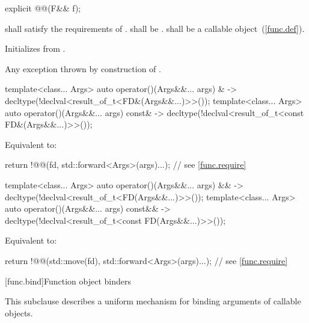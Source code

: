 \begin{itemdecl}
explicit @@(F&& f);
\end{itemdecl}

\begin{itemdescr}
\pnum
\requires
{} shall satisfy the requirements of .
 shall be .
 shall be a callable object~(\ref{func.def}).

\pnum
\effects
Initializes  from .

\pnum
\throws
Any exception thrown by construction of .
\end{itemdescr}

\begin{itemdecl}
template<class... Args>
  auto operator()(Args&&... args) &
    -> decltype(!declval<result_of_t<FD&(Args&&...)>>());
template<class... Args>
  auto operator()(Args&&... args) const&
    -> decltype(!declval<result_of_t<const FD&(Args&&...)>>());
\end{itemdecl}

\begin{itemdescr}
\pnum
\effects
Equivalent to:
\begin{codeblock}
return !@@(fd, std::forward<Args>(args)...);              // see \ref{func.require}
\end{codeblock}
\end{itemdescr}

\begin{itemdecl}
template<class... Args>
  auto operator()(Args&&... args) &&
    -> decltype(!declval<result_of_t<FD(Args&&...)>>());
template<class... Args>
  auto operator()(Args&&... args) const&&
    -> decltype(!declval<result_of_t<const FD(Args&&...)>>());
\end{itemdecl}

\begin{itemdescr}
\pnum
\effects
Equivalent to:
\begin{codeblock}
return !@@(std::move(fd), std::forward<Args>(args)...);   // see \ref{func.require}
\end{codeblock}
\end{itemdescr}

[func.bind]{Function object binders}%

\pnum
This subclause describes a uniform mechanism for binding
arguments of callable objects.

